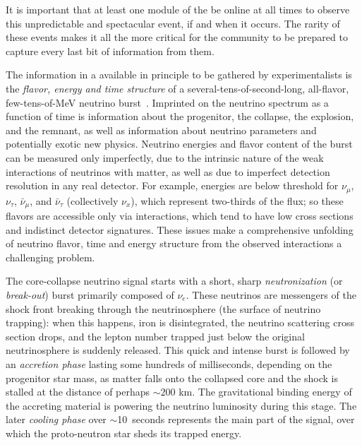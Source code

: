 It is important that at least one module of the   be online at all times to
observe this unpredictable and spectacular event, if and when it occurs.   
The rarity of these events makes it all the more critical for the community to
be prepared to capture every last bit of information from them.

The information in a  available in principle
to be gathered by experimentalists is the \textit{flavor, energy and
  time structure} of a several-tens-of-second-long, all-flavor,
few-tens-of-MeV neutrino burst~\cite{Mirizzi:2015eza, Horiuchi:2017sku}.  Imprinted on
the neutrino spectrum as a function of time is information about the
progenitor, the collapse, the explosion, and the remnant, as well as
information about neutrino parameters and potentially exotic new
physics.  Neutrino energies and flavor content of the burst can be
measured only imperfectly, due to the intrinsic nature of the weak
interactions of neutrinos with matter, as well as due to imperfect
detection resolution in any real detector.  For example,  
 energies are below  threshold for $\nu_\mu$,
$\nu_\tau$, $\bar{\nu}_\mu$, and $\bar{\nu}_{\tau}$ (collectively
$\nu_x$), which represent two-thirds of the flux; so these flavors are
accessible only via   interactions, which tend to have
low cross sections and indistinct detector signatures. 
These issues make a
comprehensive unfolding of neutrino flavor, time and energy structure
from the observed interactions a challenging problem.

The core-collapse neutrino signal starts with a short, sharp
\emph{neutronization} (or \emph{break-out}) burst primarily composed of
$\nu_e$. These neutrinos are messengers of the shock front breaking through the neutrinosphere (the surface of neutrino trapping): when this happens, iron is disintegrated, the neutrino scattering cross section drops, and the lepton number trapped just below the original neutrinosphere is suddenly released. This quick and intense burst is followed by an
\emph{accretion phase} lasting some hundreds of milliseconds, depending on the progenitor star mass, as matter falls onto the collapsed core and the shock is stalled at the distance of perhaps $\sim 200$ km. The gravitational binding energy of the accreting material is powering the neutrino luminosity during this stage. The later
\emph{cooling phase} over $\sim$10~seconds represents the main part of
the signal, over which the proto-neutron star sheds its trapped energy.  


